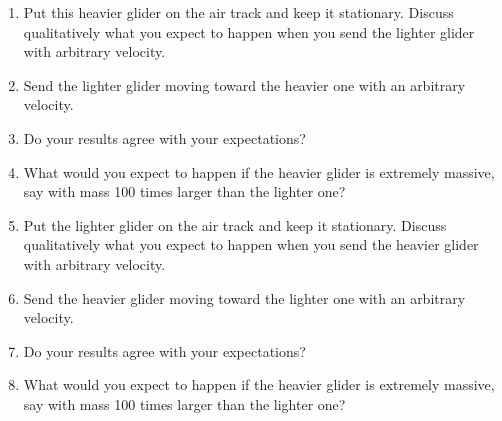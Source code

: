 \begin{enumerate}
  \item Put this heavier glider on the air track and keep it stationary. Discuss qualitatively what you expect to happen when you send the lighter glider with arbitrary velocity.
  \item  Send the lighter glider moving toward the heavier one with an arbitrary velocity.
  \item Do your results agree with your expectations?
  \item What would you expect to happen if the heavier glider is extremely massive, say with mass 100 times larger than the lighter one?

 \item Put the lighter glider on the air track and keep it stationary. Discuss qualitatively what you expect to happen when you send the heavier glider with arbitrary velocity.
  \item  Send the heavier glider moving toward the lighter one with an arbitrary velocity.
  \item Do your results agree with your expectations?
  \item What would you expect to happen if the heavier glider is extremely massive, say with mass 100 times larger than the lighter one?

\end{enumerate}

